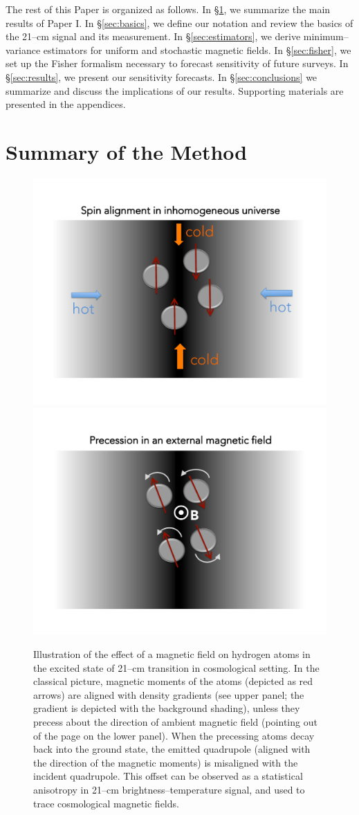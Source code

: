 \documentclass[aps,prd,twocolumn,floatfix,showpacs,superscriptaddress,nofootinbib]{revtex4-1}
\begin{document}
The rest of this Paper is organized as follows. In \S\ref{sec:method}, we summarize the main results of Paper I. In \S\ref{sec:basics}, we define our notation and review the basics of the 21--cm signal and its measurement. In \S\ref{sec:estimators}, we derive minimum--variance estimators for uniform and stochastic magnetic fields. In \S\ref{sec:fisher}, we set up the Fisher formalism necessary to forecast sensitivity of future surveys. In \S\ref{sec:results}, we present our sensitivity forecasts. In \S\ref{sec:conclusions} we summarize and discuss the implications of our results. Supporting materials are presented in the appendices.

\section{Summary of the Method}
\label{sec:method}
\begin{figure}
\centering
\includegraphics[width=.45\textwidth,keepaspectratio=true]{spin_aligned.pdf}
\includegraphics[width=.45\textwidth,keepaspectratio=true]{precession.pdf}
\caption{Illustration of the effect of a magnetic field on hydrogen atoms in the excited state of 21--cm transition in cosmological setting. In the classical picture, magnetic moments of the atoms (depicted as red arrows) are aligned with density gradients (see upper panel; the gradient is depicted with the background shading), unless they precess about the direction of ambient magnetic field (pointing out of the page on the lower panel). When the precessing atoms decay back into the ground state, the emitted quadrupole (aligned with the direction of the magnetic moments) is misaligned with the incident quadrupole. This offset can be observed as a statistical anisotropy in 21--cm brightness--temperature signal, and used to trace cosmological magnetic fields.\label{fig:precession}}
\end{figure}
\end{document}
